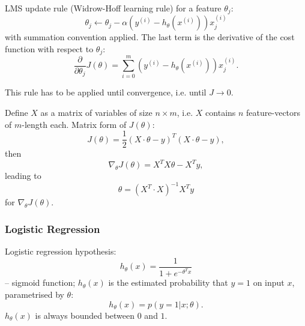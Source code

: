 \documentclass[a4paper,11pt]{article}
\begin{document}
LMS update rule (Widrow-Hoff learning rule) for a feature \textcolor{OliveGreen}{$\theta_j$}:
\begin{equation}
\theta_j \leftarrow \theta_j - \alpha \left( y^{(i)} - h_\theta \left( x^{(i)} \right) \right) x_j ^{(i)}
\end{equation}
with summation convention applied. The last term is the derivative of the cost function with respect to \textcolor{OliveGreen}{$\theta_j$}:
\begin{equation}
\frac{\partial}{\partial \theta_j} J \left( \theta \right) = \sum_{i=0} ^m \left( y^{(i)} - h_\theta \left( x^{(i)} \right) \right) x_j ^{(i)} . \label{Jdtheta}
\end{equation}

This rule has to be applied until convergence, i.e. until \textcolor{OliveGreen}{$J \rightarrow 0$}.

Define \textcolor{OliveGreen}{$X$} as a matrix of variables of size \textcolor{OliveGreen}{$n \times m$}, i.e. \textcolor{OliveGreen}{$X$} contains \textcolor{OliveGreen}{$n$} feature-vectors of \textcolor{OliveGreen}{$m$}-length each. Matrix form of \textcolor{OliveGreen}{$J \left( \theta \right)$}:
\begin{equation}
J \left( \theta \right) = \frac{1}{2} \left( X \cdot \theta - y \right)^T \left( X \cdot \theta - y \right) ,
\end{equation}
then
\begin{equation}
\nabla_\theta J \left( \theta \right) = X^T X \theta - X^T y , \label{Jnablatheta}
\end{equation}
leading to
\begin{equation}
\theta = \left( X^T \cdot X \right)^{-1} X^T y \label{theta_Normal}
\end{equation}
for \textcolor{OliveGreen}{$\nabla_\theta J \left( \theta \right)$}.
\subsubsection{Logistic Regression}
Logistic regression hypothesis:
\begin{equation}
h_\theta (x) = \frac{1}{1 + e^{-\theta^T x}}
\end{equation}
-- sigmoid function; \textcolor{OliveGreen}{$h_\theta (x)$} is the estimated probability that \textcolor{OliveGreen}{$y = 1$} on input \textcolor{OliveGreen}{$x$}, parametrised by \textcolor{OliveGreen}{$\theta$}:
\begin{equation}
h_\theta (x) = p \left( y=1 | x; \theta \right) .
\end{equation}
\textcolor{OliveGreen}{$h_\theta (x)$} is always bounded between \textcolor{OliveGreen}{$0$} and \textcolor{OliveGreen}{$1$}.
\end{document}
